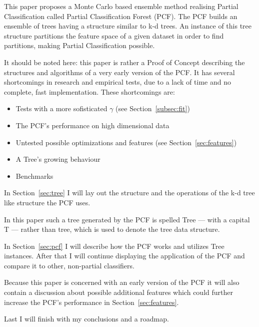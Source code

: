 This paper proposes a Monte Carlo based ensemble method
realising Partial Classification called Partial
Classification Forest (PCF). The PCF builds an ensemble of
trees having a structure similar to k-d trees. An instance
of this tree structure partitions the feature space of a
given dataset in order to find partitions, making Partial
Classification possible.

It should be noted here: this paper is rather a Proof
of Concept describing the structures and algorithms of a
very early version of the PCF. It has several shortcomings
in research and empirical tests, due to a lack of time and
no complete, fast implementation. These shortcomings are:

\begin{itemize}

\item Tests with a more sofisticated $\gamma$ (see
      Section~\ref{subsec:fit})

\item The PCF's performance on high dimensional data

\item Untested possible optimizations and features (see
      Section~\ref{sec:features})

\item A Tree's growing behaviour

\item Benchmarks

\end{itemize}

In Section~\ref{sec:tree} I will lay out
the structure and the operations of the k-d tree like
structure the PCF uses.

In this paper such a tree generated by the PCF is
spelled Tree --- with a capital T --- rather than tree,
which is used to denote the tree data structure.

In Section~\ref{sec:pcf} I will describe how the PCF works
and utilizes Tree instances. After that I will continue
displaying the application of the PCF and compare it to
other, non-partial classifiers.

Because this paper is concerned with an early version of
the PCF it will also contain a discussion about possible
additional features which could further increase the PCF's
performance in Section~\ref{sec:features}.

Last I will finish with my conclusions and a roadmap.
